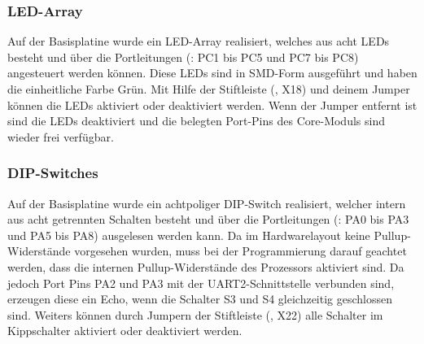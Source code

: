 
\subsubsection{LED-Array}
Auf der \gls{Basisplatine} wurde ein LED-Array realisiert, welches aus acht LEDs besteht und über die Portleitungen (: PC1 bis PC5 und PC7 bis PC8) angesteuert werden können. Diese LEDs sind in SMD-Form ausgeführt und haben die einheitliche Farbe Grün. Mit Hilfe der Stiftleiste (, X18) und deinem Jumper können die LEDs aktiviert oder deaktiviert werden. Wenn der Jumper entfernt ist sind die LEDs deaktiviert und die belegten Port-Pins des \gls{Core-Modul}s sind wieder frei verfügbar.


\subsubsection{DIP-Switches}
\label{sec:basis-dip}
Auf der \gls{Basisplatine} wurde ein achtpoliger DIP-Switch realisiert, welcher intern aus acht getrennten Schalten besteht und über die Portleitungen (: PA0 bis PA3 und PA5 bis PA8) ausgelesen werden kann. Da im Hardwarelayout keine Pullup-Widerstände vorgesehen wurden, muss bei der Programmierung darauf geachtet werden, dass die internen Pullup-Widerstände des Prozessors aktiviert sind. Da jedoch Port Pins PA2 und PA3 mit der UART2-Schnittstelle verbunden sind, erzeugen diese ein Echo, wenn die Schalter S3 und S4 gleichzeitig geschlossen sind. Weiters können durch Jumpern der Stiftleiste (, X22) alle Schalter im Kippschalter aktiviert oder deaktiviert werden.



